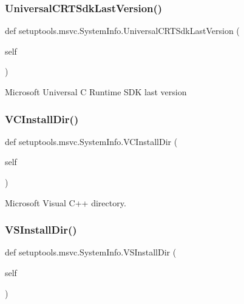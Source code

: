 \subsubsection{\texorpdfstring{Universal\+C\+R\+T\+Sdk\+Last\+Version()}{UniversalCRTSdkLastVersion()}}
{\footnotesize\ttfamily def setuptools.\+msvc.\+System\+Info.\+Universal\+C\+R\+T\+Sdk\+Last\+Version (\begin{DoxyParamCaption}\item[{}]{self }\end{DoxyParamCaption})}

\begin{DoxyVerb}Microsoft Universal C Runtime SDK last version
\end{DoxyVerb}
 \mbox{\label{classsetuptools_1_1msvc_1_1_system_info_a64320eef8ba2ab8929cb03aa8308fc2d}} 
\subsubsection{\texorpdfstring{V\+C\+Install\+Dir()}{VCInstallDir()}}
{\footnotesize\ttfamily def setuptools.\+msvc.\+System\+Info.\+V\+C\+Install\+Dir (\begin{DoxyParamCaption}\item[{}]{self }\end{DoxyParamCaption})}

\begin{DoxyVerb}Microsoft Visual C++ directory.
\end{DoxyVerb}
 \mbox{\label{classsetuptools_1_1msvc_1_1_system_info_aa117395fa193bff19dde5fbb4cf6e3a3}} 
\subsubsection{\texorpdfstring{V\+S\+Install\+Dir()}{VSInstallDir()}}
{\footnotesize\ttfamily def setuptools.\+msvc.\+System\+Info.\+V\+S\+Install\+Dir (\begin{DoxyParamCaption}\item[{}]{self }\end{DoxyParamCaption})}

